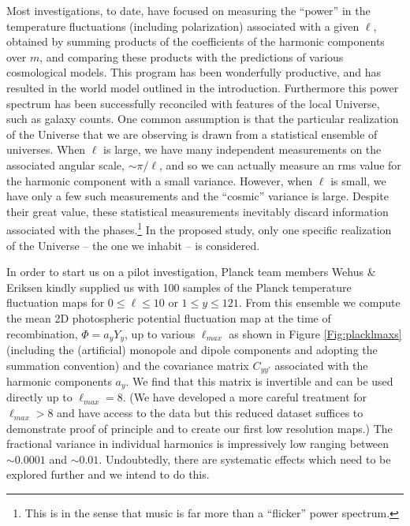 \documentclass[psfig,12pt]{article}
\begin{document}
Most investigations, to date, have focused on measuring the ``power'' in the
temperature fluctuations (including polarization) associated with a
given $\ell$, obtained by summing products of the coefficients of the
harmonic components over $m$, and comparing these products with the predictions of
various cosmological models. This program has been wonderfully
productive, and has resulted in the world model outlined in the introduction.
Furthermore this power spectrum has been successfully reconciled with
features of the local Universe, such as galaxy counts. One common
assumption is that the particular realization of the Universe that we
are observing is drawn from a statistical ensemble of universes. When
$\ell$ is large, we have many independent measurements on the associated
angular scale, $\sim\pi/\ell$, and so we can actually measure an rms value for
the harmonic component with a small variance. However, when $\ell$ is
small, we have only a few such measurements and the ``cosmic'' variance
is large. Despite their great value, these statistical measurements
inevitably discard information associated with the phases.\footnote{This is
in the sense that music is far more than a ``flicker'' power spectrum.}  In the proposed study, only one specific realization of the
Universe -- the one we inhabit --  is considered.

In order to start us on a pilot investigation, Planck team members Wehus \&
Eriksen kindly supplied us with 100 samples of the Planck temperature
fluctuation maps for $0\le\ell\le10$ or $1\le y\le121$. From this
ensemble we compute the mean 2D photospheric potential
fluctuation map at the time of recombination, $\Phi=a_yY_y$, up to various $\ell_{max}$ as shown in Figure \ref{Fig:placklmaxs} (including
the (artificial) monopole and dipole components and adopting the summation
convention) and the covariance matrix $C_{yy'}$ associated with the
harmonic components $a_y$. We find that this matrix is invertible and
can be used directly up to $\ell_{max}=8$. (We have developed a more careful treatment for $\ell_{max}>8$ and have access to the data but this reduced dataset suffices to demonstrate proof of principle and to create our first low resolution maps.) The fractional variance in individual harmonics
is impressively low ranging between $\sim0.0001$ and $\sim0.01$. Undoubtedly, there are
systematic effects which need to be explored further and we intend to do this.
\end{document}
